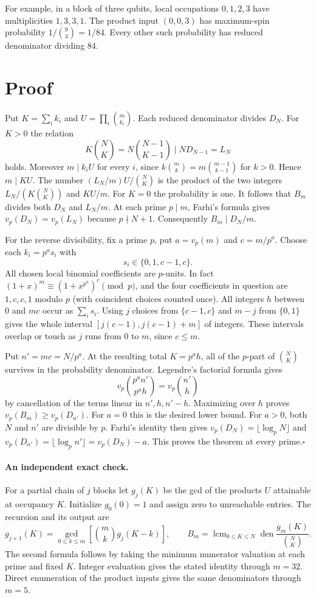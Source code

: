 \documentclass[11pt]{article}
\newcommand{\lcm}{\operatorname{lcm}}
\newcommand{\den}{\operatorname{den}}
\begin{document}
For example, in a block of three qubits, local occupations $0,1,2,3$ have multiplicities $1,3,3,1$. The product input $(0,0,3)$ has maximum-spin probability $1/\binom{9}{3}=1/84$. Every other such probability has reduced denominator dividing $84$.

\newpage
\section*{Proof}
Put $K=\sum_i k_i$ and $U=\prod_i\binom m{k_i}$. Each reduced denominator divides $D_N$. For $K>0$ the relation
\[
 K\binom NK=N\binom{N-1}{K-1}\mid N D_{N-1}=L_N
\]
holds. Moreover $m\mid k_i U$ for every $i$, since $k\binom mk=m\binom{m-1}{k-1}$ for $k>0$. Hence $m\mid K U$. The number $(L_N/m)U/\binom NK$ is the product of the two integers $L_N/(K\binom NK)$ and $KU/m$. For $K=0$ the probability is one. It follows that $B_m$ divides both $D_N$ and $L_N/m$. At each prime $p\mid m$, Farhi's formula gives $v_p(D_N)=v_p(L_N)$ because $p\nmid N+1$. Consequently $B_m\mid D_N/m$.

For the reverse divisibility, fix a prime $p$, put $a=v_p(m)$ and $c=m/p^a$. Choose each $k_i=p^a s_i$ with
\[
                       s_i\in\{0,1,c-1,c\}.
\]
All chosen local binomial coefficients are $p$-units. In fact $(1+x)^m\equiv(1+x^{p^a})^c\pmod p$, and the four coefficients in question are $1,c,c,1$ modulo $p$ (with coincident choices counted once). All integers $h$ between $0$ and $mc$ occur as $\sum_i s_i$. Using $j$ choices from $\{c-1,c\}$ and $m-j$ from $\{0,1\}$ gives the whole interval $[j(c-1),j(c-1)+m]$ of integers. These intervals overlap or touch as $j$ runs from $0$ to $m$, since $c\le m$.

Put $n'=mc=N/p^a$. At the resulting total $K=p^a h$, all of the $p$-part of $\binom{N}{K}$ survives in the probability denominator. Legendre's factorial formula gives
\[
 v_p\binom{p^a n'}{p^a h}=v_p\binom{n'}h
\]
by cancellation of the terms linear in $n',h,n'-h$. Maximizing over $h$ proves $v_p(B_m)\ge v_p(D_{n'})$. For $a=0$ this is the desired lower bound. For $a>0$, both $N$ and $n'$ are divisible by $p$. Farhi's identity then gives $v_p(D_N)=\lfloor\log_p N\rfloor$ and $v_p(D_{n'})=\lfloor\log_p n'\rfloor=v_p(D_N)-a$. This proves the theorem at every prime.\hfill$\square$

\paragraph{An independent exact check.}
For a partial chain of $j$ blocks let $g_j(K)$ be the gcd of the products $U$ attainable at occupancy $K$. Initialize $g_0(0)=1$ and assign zero to unreachable entries. The recursion and its output are
\[
 g_{j+1}(K)=\gcd_{0\le k\le m}\left[\binom mk g_j(K-k)\right],
 \qquad
 B_m=\lcm_{0\le K\le N}\den\frac{g_m(K)}{\binom NK}.
\]
The second formula follows by taking the minimum numerator valuation at each prime and fixed $K$. Integer evaluation gives the stated identity through $m=32$. Direct enumeration of the product inputs gives the same denominators through $m=5$.
\end{document}
